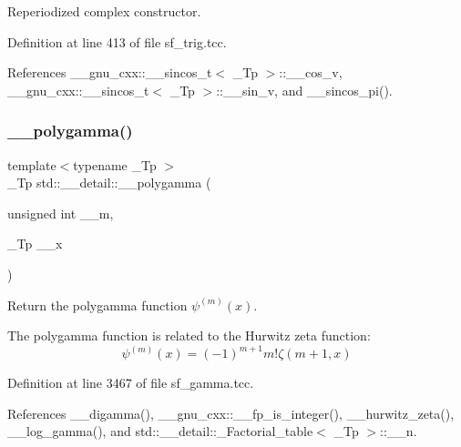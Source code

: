 Reperiodized complex constructor. 

Definition at line 413 of file sf\+\_\+trig.\+tcc.



References \+\_\+\+\_\+gnu\+\_\+cxx\+::\+\_\+\+\_\+sincos\+\_\+t$<$ \+\_\+\+Tp $>$\+::\+\_\+\+\_\+cos\+\_\+v, \+\_\+\+\_\+gnu\+\_\+cxx\+::\+\_\+\+\_\+sincos\+\_\+t$<$ \+\_\+\+Tp $>$\+::\+\_\+\+\_\+sin\+\_\+v, and \+\_\+\+\_\+sincos\+\_\+pi().

\mbox{\label{namespacestd_1_1____detail_a25cc1b7c8adbc3b0fc8d4487ab23571c}} 
\subsubsection{\texorpdfstring{\+\_\+\+\_\+polygamma()}{\_\_polygamma()}}
{\footnotesize\ttfamily template$<$typename \+\_\+\+Tp $>$ \\
\+\_\+\+Tp std\+::\+\_\+\+\_\+detail\+::\+\_\+\+\_\+polygamma (\begin{DoxyParamCaption}\item[{unsigned int}]{\+\_\+\+\_\+m,  }\item[{\+\_\+\+Tp}]{\+\_\+\+\_\+x }\end{DoxyParamCaption})}



Return the polygamma function $ \psi^{(m)}(x) $. 

The polygamma function is related to the Hurwitz zeta function\+: \[ \psi^{(m)}(x) = (-1)^{m+1} m! \zeta(m+1,x) \] 

Definition at line 3467 of file sf\+\_\+gamma.\+tcc.



References \+\_\+\+\_\+digamma(), \+\_\+\+\_\+gnu\+\_\+cxx\+::\+\_\+\+\_\+fp\+\_\+is\+\_\+integer(), \+\_\+\+\_\+hurwitz\+\_\+zeta(), \+\_\+\+\_\+log\+\_\+gamma(), and std\+::\+\_\+\+\_\+detail\+::\+\_\+\+Factorial\+\_\+table$<$ \+\_\+\+Tp $>$\+::\+\_\+\+\_\+n.

\mbox{\label{namespacestd_1_1____detail_a17fb8cea11706f319aaea277188a29c8}} 
